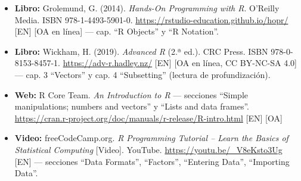 \begin{itemize}
\tightlist
\item
  \textbf{Libro:} Grolemund, G. (2014). \emph{Hands-On Programming with
  R}. O'Reilly Media. ISBN 978-1-4493-5901-0.
  \url{https://rstudio-education.github.io/hopr/} {[}EN{]} {[}OA en
  línea{]} --- cap. ``R Objects'' y ``R Notation''.
\item
  \textbf{Libro:} Wickham, H. (2019). \emph{Advanced R} (2.ª ed.). CRC
  Press. ISBN 978-0-8153-8457-1. \url{https://adv-r.hadley.nz/} {[}EN{]}
  {[}OA en línea, CC BY-NC-SA 4.0{]} --- cap. 3 ``Vectors'' y cap. 4
  ``Subsetting'' (lectura de profundización).
\item
  \textbf{Web:} R Core Team. \emph{An Introduction to R} --- secciones
  ``Simple manipulations; numbers and vectors'' y ``Lists and data
  frames''.
  \url{https://cran.r-project.org/doc/manuals/r-release/R-intro.html}
  {[}EN{]} {[}OA{]}
\item
  \textbf{Video:} freeCodeCamp.org. \emph{R Programming Tutorial --
  Learn the Basics of Statistical Computing} {[}Video{]}. YouTube.
  \url{https://youtu.be/_V8eKsto3Ug} {[}EN{]} --- secciones ``Data
  Formats'', ``Factors'', ``Entering Data'', ``Importing Data''.
\end{itemize}
